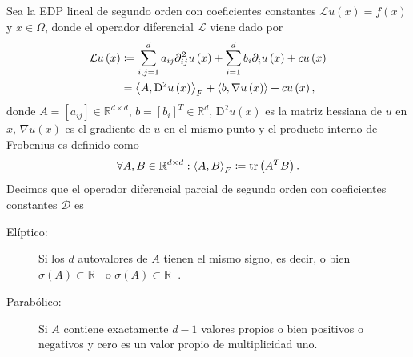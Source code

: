 \begin{definition}
	Sea la EDP lineal de segundo orden con coeficientes constantes
	\begin{math}
		\mathcal{L}u\left(x\right)=
		f\left(x\right)
	\end{math}
	y $x\in\Omega$, donde el operador diferencial $\mathcal{L}$ viene
	dado por
	\begin{align*}
		\mathcal{L}
		u\left(x\right) & \coloneqq
		\sum_{i,j=1}^{d}
		a_{ij}
		\difcp[2]{u}{ij}\left(x\right)+
		\sum_{i=1}^{d}
		b_{i}
		\difcp{u}{i}\left(x\right)+
		cu\left(x\right)            \\
		                & =
		{
		\inner{A}{\mathrm{D}^{2}u\left(x\right)}
		}_{F}+
		\inner{b}{\nabla u\left(x\right)}+
		c
		u\left(x\right),
	\end{align*}
	donde $A=\left[a_{ij}\right]\in\mathbb{R}^{d\times d}$,
	\begin{math}
		b={\left[b_{i}\right]}^{T}\in\mathbb{R}^{d}
	\end{math},
	\begin{math}
		\mathrm{D}^{2}u\left(x\right)
	\end{math}
	es la matriz hessiana de $u$ en $x$,
	\begin{math}
		\nabla u\left(x\right)
	\end{math}
	es el gradiente de $u$ en el mismo punto y el producto interno de
	Frobenius es definido como
	\begin{equation*}
		\forall A,B\in\mathbb{R}^{d\times d}:
		{\inner{A}{B}}_{F}\coloneqq
		\operatorname{tr}
		\left(A^{T}B\right).
	\end{equation*}
	Decimos que el operador diferencial parcial de segundo orden con
	coeficientes constantes $\mathcal{D}$ es
	\begin{description}
		\item[Elíptico:]

		      Si los $d$ autovalores de $A$ tienen el mismo signo, es
		      decir, o bien
		      \begin{math}
			      \sigma\left(A\right)\subset\mathbb{R}_{+}
		      \end{math}
		      o
		      \begin{math}
			      \sigma\left(A\right)\subset\mathbb{R}_{-}
		      \end{math}.

		\item[Parabólico:]

		      Si $A$ contiene exactamente $d-1$ valores propios o bien
		      positivos o negativos y cero es un valor propio de
		      multiplicidad uno.


\end{description}
\end{definition}
